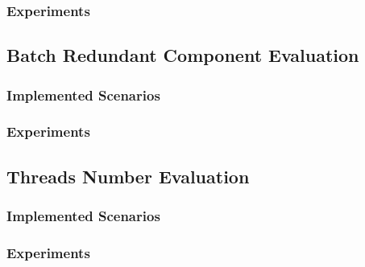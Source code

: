 \documentclass[10pt,a4paper]{article}
\begin{document}
\subsubsection{Experiments} 

\subsection{Batch Redundant Component Evaluation}
\subsubsection{Implemented Scenarios} 
\subsubsection{Experiments} 

\subsection{Threads Number Evaluation}
\subsubsection{Implemented Scenarios} 
\subsubsection{Experiments} 

\pagebreak
\end{document}
